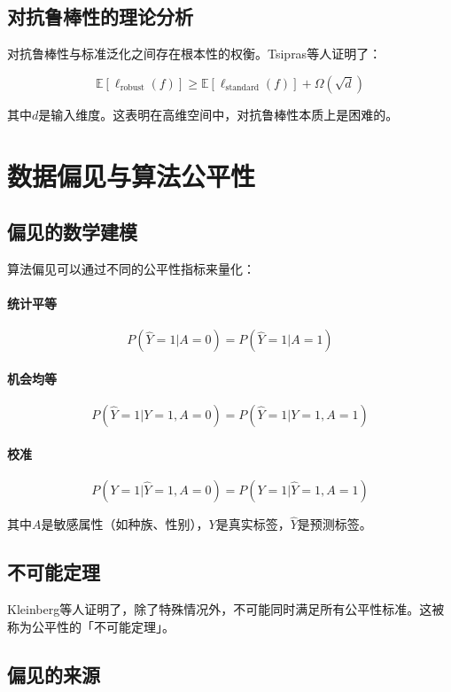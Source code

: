 \subsection{对抗鲁棒性的理论分析}

对抗鲁棒性与标准泛化之间存在根本性的权衡。Tsipras等人证明了：

$$\mathbb{E}[\ell_{\text{robust}}(f)] \geq \mathbb{E}[\ell_{\text{standard}}(f)] + \Omega(\sqrt{d})$$

其中$d$是输入维度。这表明在高维空间中，对抗鲁棒性本质上是困难的。

\section{数据偏见与算法公平性}

\subsection{偏见的数学建模}

算法偏见可以通过不同的公平性指标来量化：

\paragraph{统计平等}
$$P(\hat{Y} = 1 | A = 0) = P(\hat{Y} = 1 | A = 1)$$

\paragraph{机会均等}
$$P(\hat{Y} = 1 | Y = 1, A = 0) = P(\hat{Y} = 1 | Y = 1, A = 1)$$

\paragraph{校准}
$$P(Y = 1 | \hat{Y} = 1, A = 0) = P(Y = 1 | \hat{Y} = 1, A = 1)$$

其中$A$是敏感属性（如种族、性别），$Y$是真实标签，$\hat{Y}$是预测标签。

\subsection{不可能定理}

Kleinberg等人证明了，除了特殊情况外，不可能同时满足所有公平性标准。这被称为公平性的「不可能定理」。

\subsection{偏见的来源}

